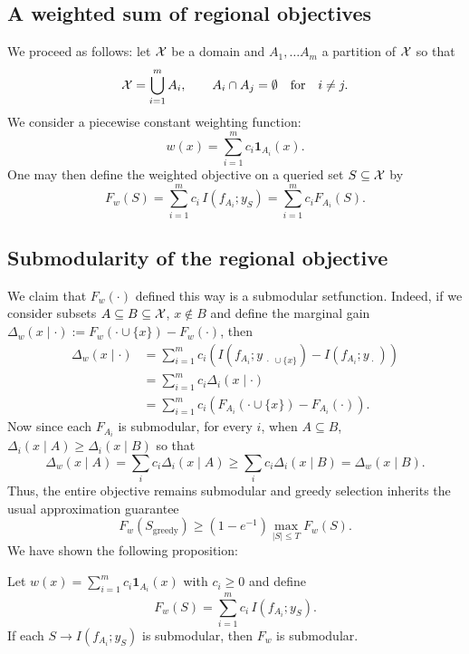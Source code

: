 \subsection{A weighted sum of regional objectives}

We proceed as follows: let $\mathcal{X}$ be a domain and $A_1, \ldots A_m$ a partition of $\mathcal{X}$ so that
\begin{equation*}
\mathcal{X}=\bigcup_{i=1}^m A_i,
\qquad
A_i \cap A_j = \emptyset \quad \text{for} \quad i \neq j.
\end{equation*}
We consider a piecewise constant weighting function:
\begin{equation*}
w(x)=\sum_{i=1}^m c_i\mathbf{1}_{A_i}(x).
\end{equation*}
One may then define the weighted objective on a queried set $S \subseteq \mathcal{X}$ by
\begin{equation*}
F_w(S)
=
\sum_{i=1}^m
c_i\,I(f_{A_i};y_S) = \sum_{i=1}^m
c_i F_{A_i}(S).
\end{equation*}

\subsection{Submodularity of the regional objective}

We claim that $F_w(\cdot)$ defined this way is a submodular setfunction. Indeed, if we consider subsets $A \subseteq B \subseteq \mathcal{X}$, $x \notin B$ and define the marginal gain $\Delta_w(x \mid \cdot) := F_w(\cdot \cup \{x\}) - F_w(\cdot)$, then
\begin{align*}
    \Delta_w(x \mid \cdot) &= \sum_{i=1}^m c_i \left( I(f_{A_i}; y_{\; \cdot \; \cup \{x\}}) - I(f_{A_i}; y_{\; \cdot \;}) \right) \\
    &= \sum_{i=1}^m c_i \Delta_i(x \mid \cdot) \\
    &= \sum_{i=1}^m c_i \left(F_{A_i}(\cdot \cup \{x\}) - F_{A_i}(\cdot)\right).
\end{align*}
Now since each $F_{A_i}$ is submodular, for every $i$, when $A\subseteq B$, $\Delta_i(x \mid A) \geq \Delta_i(x \mid B)$ so that 
\begin{equation*}
    \Delta_w(x \mid A) = \sum_i c_i \Delta_i(x \mid A) \geq \sum_i c_i \Delta_i(x \mid B) = \Delta_w(x \mid B).
\end{equation*}
Thus, the entire objective remains submodular and greedy selection inherits the usual approximation guarantee
\begin{equation*}
F_w(S_{\mathrm{greedy}})
\geq
(1-e^{-1})
\max_{|S|\leq T}
F_w(S).
\end{equation*}
We have shown the following proposition:
\begin{proposition} \label{prop: submodularobj}
    Let $w(x)=\sum_{i=1}^m c_i\mathbf{1}_{A_i}(x)$ with $c_i \geq 0$ and define 
    $$F_w(S)=
    \sum_{i=1}^m
    c_i\,I(f_{A_i};y_S).$$ 
    If each $S \to I(f_{A_i}; y_S)$ is submodular, then $F_w$ is submodular.
\end{proposition}

